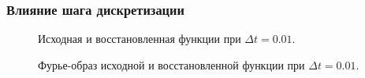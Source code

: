 \documentclass[a5paper, 10pt]{article}
\theoremstyle{definition}
\theoremstyle{plain}
\theoremstyle{remark}
\begin{document}
\newpage
\subsubsection{Влияние шага дискретизации}
\begin{figure}[h!]
\caption{Исходная и восстановленная функции при $\Delta t = 0.01$.}
\caption{Фурье-образ исходной и восстановленной функции при $\Delta t = 0.01$.}
\end{figure}
\end{document}
